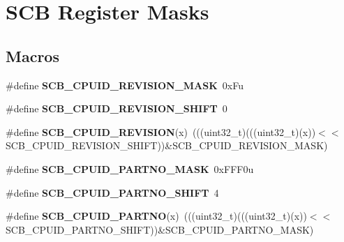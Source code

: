 \hypertarget{group___s_c_b___register___masks}{}\section{S\+CB Register Masks}
\label{group___s_c_b___register___masks}
\subsection*{Macros}
\begin{DoxyCompactItemize}
\item 
\mbox{\label{group___s_c_b___register___masks_ga85fcec5a1a285bf2ead09d715e7fd825}} 
\#define {\bfseries S\+C\+B\+\_\+\+C\+P\+U\+I\+D\+\_\+\+R\+E\+V\+I\+S\+I\+O\+N\+\_\+\+M\+A\+SK}~0x\+Fu
\item 
\mbox{\label{group___s_c_b___register___masks_ga6c4bd208cc5af38612bf38b291f8312d}} 
\#define {\bfseries S\+C\+B\+\_\+\+C\+P\+U\+I\+D\+\_\+\+R\+E\+V\+I\+S\+I\+O\+N\+\_\+\+S\+H\+I\+FT}~0
\item 
\mbox{\label{group___s_c_b___register___masks_ga373e184611c0c22cc1aae46fd5cca3bb}} 
\#define {\bfseries S\+C\+B\+\_\+\+C\+P\+U\+I\+D\+\_\+\+R\+E\+V\+I\+S\+I\+ON}(x)~(((uint32\+\_\+t)(((uint32\+\_\+t)(x))$<$$<$S\+C\+B\+\_\+\+C\+P\+U\+I\+D\+\_\+\+R\+E\+V\+I\+S\+I\+O\+N\+\_\+\+S\+H\+I\+FT))\&S\+C\+B\+\_\+\+C\+P\+U\+I\+D\+\_\+\+R\+E\+V\+I\+S\+I\+O\+N\+\_\+\+M\+A\+SK)
\item 
\mbox{\label{group___s_c_b___register___masks_ga59f6aaadd9ecf7fed4e622ab8052f8d4}} 
\#define {\bfseries S\+C\+B\+\_\+\+C\+P\+U\+I\+D\+\_\+\+P\+A\+R\+T\+N\+O\+\_\+\+M\+A\+SK}~0x\+F\+F\+F0u
\item 
\mbox{\label{group___s_c_b___register___masks_gac28acf4ce5242a53961b9549e7dd0115}} 
\#define {\bfseries S\+C\+B\+\_\+\+C\+P\+U\+I\+D\+\_\+\+P\+A\+R\+T\+N\+O\+\_\+\+S\+H\+I\+FT}~4
\item 
\mbox{\label{group___s_c_b___register___masks_gab245ae8d984e1c60ab16b8cd4d074b00}} 
\#define {\bfseries S\+C\+B\+\_\+\+C\+P\+U\+I\+D\+\_\+\+P\+A\+R\+T\+NO}(x)~(((uint32\+\_\+t)(((uint32\+\_\+t)(x))$<$$<$S\+C\+B\+\_\+\+C\+P\+U\+I\+D\+\_\+\+P\+A\+R\+T\+N\+O\+\_\+\+S\+H\+I\+FT))\&S\+C\+B\+\_\+\+C\+P\+U\+I\+D\+\_\+\+P\+A\+R\+T\+N\+O\+\_\+\+M\+A\+SK)

\end{DoxyCompactItemize}
